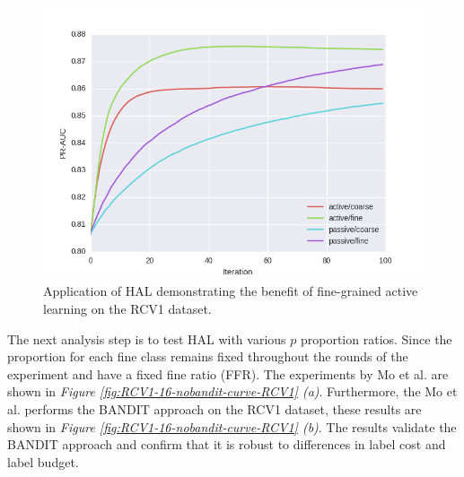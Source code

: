 \documentclass[ms]{nuthesis}
\begin{document}
\FloatBarrier
\begin{figure}[!htb]
	\centering
    \includegraphics[width=0.75\columnwidth]{fig/draft-RCV1}
    \caption{Application of HAL demonstrating the benefit of fine-grained active learning
    on the RCV1 dataset.}
    \label{fig:draft-RCV1}
\end{figure}
\FloatBarrier

\par The next analysis step is to test HAL with various $p$ proportion ratios. Since
the proportion for each fine class remains fixed throughout the rounds of the experiment
and have a fixed fine ratio (FFR). The experiments by Mo et al. \cite{yugi} are shown in
 \textit{Figure \ref{fig:RCV1-16-nobandit-curve-RCV1} (a)}.  Furthermore, the Mo et al. performs the
 BANDIT approach on the RCV1
dataset, these results are shown in \textit{Figure \ref{fig:RCV1-16-nobandit-curve-RCV1} (b)}. The results
validate the BANDIT approach and confirm that it is robust to differences in label cost and
label budget.
\end{document}
